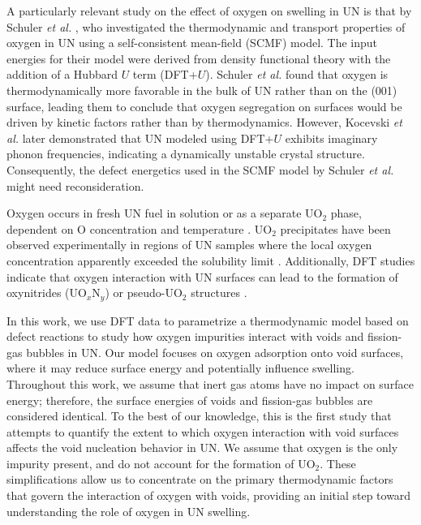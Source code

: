 \documentclass[preprint,12pt,sort&compress]{elsarticle}
\newcommand{\?}{\stackrel{?}{=}}
\begin{document}
A particularly relevant study on the effect of oxygen on swelling in UN is that by Schuler \textit{et al.} \cite{Schuler2017}, who investigated the thermodynamic and transport properties of oxygen in UN using a self-consistent mean-field (SCMF) model. The input energies for their model were derived from density functional theory with the addition of a Hubbard $U$ term (DFT+$U$). Schuler \textit{et al.} found that oxygen is thermodynamically more favorable in the bulk of UN rather than on the (001) surface, leading them to conclude that oxygen segregation on surfaces would be driven by kinetic factors rather than by thermodynamics. However, Kocevski \textit{et al.} \cite{Kocevski2022I} later demonstrated that UN modeled using DFT+$U$ exhibits imaginary phonon frequencies, indicating a dynamically unstable crystal structure. Consequently, the defect energetics used in the SCMF model by Schuler \textit{et al.} might need reconsideration. %

Oxygen occurs in fresh UN fuel in solution or as a separate UO$_2$ phase, dependent on O concentration and temperature \cite{Lyubimov2014}. UO$_2$ precipitates have been observed experimentally in regions of UN samples where the local oxygen concentration apparently exceeded the solubility limit \cite{Mishchenko2021}. Additionally, DFT studies indicate that oxygen interaction with UN surfaces can lead to the formation of oxynitrides (UO$_x$N$_y$) or pseudo-UO$_2$ structures \cite{Bocharov2013, Lopes2016}.

In this work, we use DFT data to parametrize a thermodynamic model based on defect reactions to study how oxygen impurities interact with voids and fission-gas bubbles in UN. Our model focuses on oxygen adsorption onto void surfaces, where it may reduce surface energy and potentially influence swelling. Throughout this work, we assume that inert gas atoms have no impact on surface energy; therefore, the surface energies of voids and fission-gas bubbles are considered identical. To the best of our knowledge, this is the first study that attempts to quantify the extent to which oxygen interaction with void surfaces affects the void nucleation behavior in UN. We assume that oxygen is the only impurity present, and do not account for the formation of UO$_2$. These simplifications allow us to concentrate on the primary thermodynamic factors that govern the interaction of oxygen with voids, providing an initial step toward understanding the role of oxygen in UN swelling.
\end{document}
